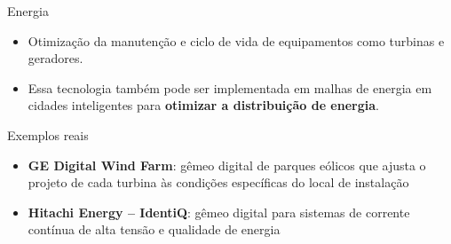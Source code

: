 \documentclass[aspectratio=169,xcolor=dvipsnames]{beamer}
\begin{document}
\begin{frame}{Energia}
    \begin{itemize}
        \item Otimização da manutenção e ciclo de vida de equipamentos como turbinas e geradores.
        \item Essa tecnologia também pode ser implementada em malhas de energia em cidades inteligentes para \textbf{otimizar a distribuição de energia}.
    \end{itemize}
    \begin{exampleblock}{Exemplos reais}
        \begin{itemize}
            \item \textbf{GE Digital Wind Farm}: gêmeo digital de parques eólicos que ajusta o projeto de cada turbina às condições específicas do local de instalação
            \item \textbf{Hitachi Energy -- IdentiQ}: gêmeo digital para sistemas de corrente contínua de alta tensão e qualidade de energia
        \end{itemize}
    \end{exampleblock}
\end{frame}
\end{document}
